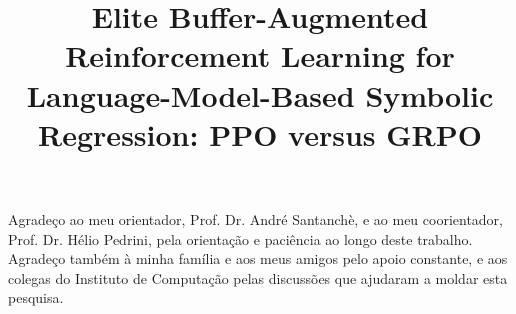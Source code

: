 \documentclass[Ingles, hidelinks]{ic-tese-v3} %
\begin{document}
\title{Elite Buffer-Augmented Reinforcement Learning for Language-Model-Based Symbolic Regression: PPO versus GRPO}


\mestrado




\paginasiniciais

Agradeço ao meu orientador, Prof. Dr. André Santanchè, e ao meu coorientador, Prof. Dr. Hélio Pedrini, pela orientação e paciência ao longo deste trabalho. Agradeço também à minha família e aos meus amigos pelo apoio constante, e aos colegas do Instituto de Computação pelas discussões que ajudaram a moldar esta pesquisa. %
\end{document}
